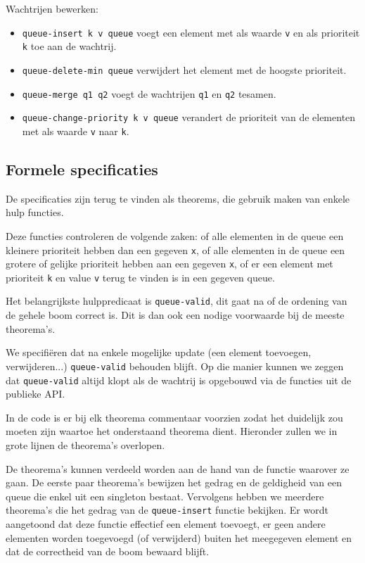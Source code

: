 \documentclass[a4paper,10pt]{article}
\begin{document}
Wachtrijen bewerken:

\begin{itemize}
    \item \texttt{queue-insert k v queue} voegt een element met als waarde
    \texttt{v} en als prioriteit \texttt{k} toe aan de wachtrij.
    \item \texttt{queue-delete-min queue} verwijdert het element met de hoogste
    prioriteit.
    \item \texttt{queue-merge q1 q2} voegt de wachtrijen \texttt{q1} en
    \texttt{q2} tesamen.
    \item \texttt{queue-change-priority k v queue} verandert de prioriteit van
    de elementen met als waarde \texttt{v} naar \texttt{k}.
\end{itemize}

\subsection{Formele specificaties}

De specificaties zijn terug te vinden als theorems, die gebruik maken van enkele
hulp functies.

Deze functies controleren de volgende zaken: of alle elementen in de queue een
kleinere prioriteit hebben dan een gegeven \texttt{x}, of alle elementen in de
queue een grotere of gelijke prioriteit hebben aan een gegeven \texttt{x}, of er
een element met prioriteit \texttt{k} en value \texttt{v} terug te vinden is in
een gegeven queue.

Het belangrijkste hulppredicaat is \texttt{queue-valid}, dit gaat na of de
ordening van de gehele boom correct is. Dit is dan ook een nodige voorwaarde bij
de meeste theorema's.

We specifi\"eren dat na enkele mogelijke update (een element toevoegen,
verwijderen...) \texttt{queue-valid} behouden blijft. Op die manier kunnen we
zeggen dat \texttt{queue-valid} altijd klopt als de wachtrij is opgebouwd via de
functies uit de publieke API.

In de code is er bij elk theorema commentaar voorzien zodat het duidelijk
zou moeten zijn waartoe het onderstaand theorema dient. Hieronder zullen we 
in grote lijnen de theorema's overlopen.

De theorema's kunnen verdeeld worden aan de hand van de functie waarover 
ze gaan. De eerste paar theorema's bewijzen het gedrag en de geldigheid van een 
queue die enkel uit een singleton bestaat. Vervolgens hebben we meerdere 
theorema's die het gedrag van de \texttt{queue-insert} functie bekijken. Er 
wordt aangetoond dat deze functie effectief een element toevoegt, er geen 
andere elementen worden toegevoegd (of verwijderd) buiten het meegegeven 
element en dat de correctheid van de boom bewaard blijft. 
\end{document}
